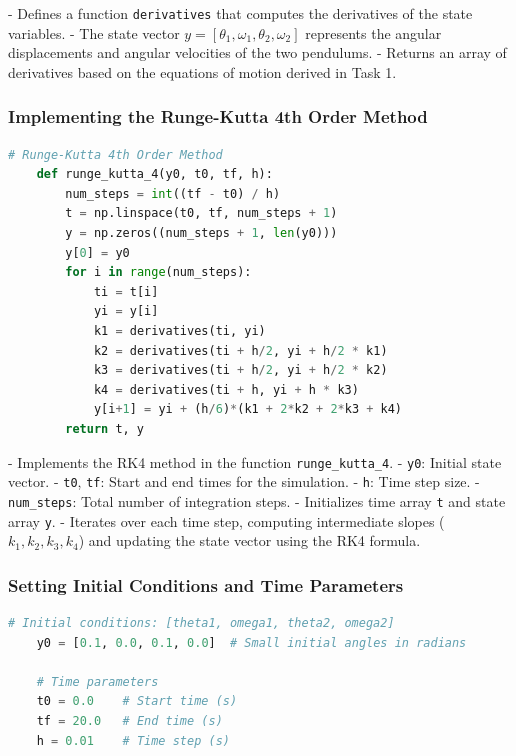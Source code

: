 \documentclass[12pt]{report} %
\begin{document}
    - Defines a function \texttt{derivatives} that computes the derivatives of the state variables.
    - The state vector \( y = [\theta_1, \omega_1, \theta_2, \omega_2] \) represents the angular displacements and angular velocities of the two pendulums.
    - Returns an array of derivatives based on the equations of motion derived in Task 1.
    
    \subsubsection{Implementing the Runge-Kutta 4th Order Method}
    
    \begin{lstlisting}[language=Python, caption={Runge-Kutta 4th Order Method Implementation}, label={lst:rk4_implementation}]
    # Runge-Kutta 4th Order Method
    def runge_kutta_4(y0, t0, tf, h):
        num_steps = int((tf - t0) / h)
        t = np.linspace(t0, tf, num_steps + 1)
        y = np.zeros((num_steps + 1, len(y0)))
        y[0] = y0
        for i in range(num_steps):
            ti = t[i]
            yi = y[i]
            k1 = derivatives(ti, yi)
            k2 = derivatives(ti + h/2, yi + h/2 * k1)
            k3 = derivatives(ti + h/2, yi + h/2 * k2)
            k4 = derivatives(ti + h, yi + h * k3)
            y[i+1] = yi + (h/6)*(k1 + 2*k2 + 2*k3 + k4)
        return t, y
    \end{lstlisting}
    
    - Implements the RK4 method in the function \texttt{runge\_kutta\_4}.
    - \texttt{y0}: Initial state vector.
    - \texttt{t0}, \texttt{tf}: Start and end times for the simulation.
    - \texttt{h}: Time step size.
    - \texttt{num\_steps}: Total number of integration steps.
    - Initializes time array \texttt{t} and state array \texttt{y}.
    - Iterates over each time step, computing intermediate slopes (\( k_1, k_2, k_3, k_4 \)) and updating the state vector using the RK4 formula.
    
    \subsubsection{Setting Initial Conditions and Time Parameters}
    
    \begin{lstlisting}[language=Python, caption={Initial Conditions and Time Parameters}, label={lst:initial_conditions}]
    # Initial conditions: [theta1, omega1, theta2, omega2]
    y0 = [0.1, 0.0, 0.1, 0.0]  # Small initial angles in radians
    
    # Time parameters
    t0 = 0.0    # Start time (s)
    tf = 20.0   # End time (s)
    h = 0.01    # Time step (s)
    \end{lstlisting}
    
\end{document}

